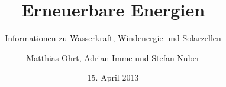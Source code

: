 \subject{Ausarbeitung}
\title{Erneuerbare Energien}
\subtitle{Informationen zu Wasserkraft, Windenergie und Solarzellen}
\author{Matthias Ohrt, Adrian Imme und Stefan Nuber}
\date{15. April 2013}

\maketitle

